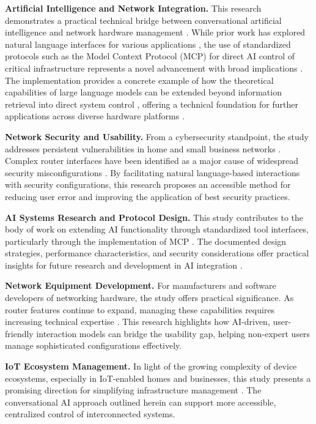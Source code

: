 \textbf{Artificial Intelligence and Network Integration.} This research demonstrates a practical technical bridge between conversational artificial intelligence and network hardware management \cite{ai_mediated_interface}. While prior work has explored natural language interfaces for various applications \cite{nlp_cybersecurity}, the use of standardized protocols such as the Model Context Protocol (MCP) for direct AI control of critical infrastructure represents a novel advancement with broad implications \cite{mcp_developer}. The implementation provides a concrete example of how the theoretical capabilities of large language models \cite{llm_reasoning} can be extended beyond information retrieval into direct system control \cite{mcp_intro}, offering a technical foundation for further applications across diverse hardware platforms \cite{vpn_study}.

\textbf{Network Security and Usability.} From a cybersecurity standpoint, the study addresses persistent vulnerabilities in home and small business networks \cite{consumer_cybersecurity}. Complex router interfaces have been identified as a major cause of widespread security misconfigurations \cite{wifi_security_settings}. By facilitating natural language-based interactions with security configurations, this research proposes an accessible method for reducing user error and improving the application of best security practices.

\textbf{AI Systems Research and Protocol Design.} This study contributes to the body of work on extending AI functionality through standardized tool interfaces, particularly through the implementation of MCP \cite{mcp_intro}. The documented design strategies, performance characteristics, and security considerations offer practical insights for future research and development in AI integration \cite{ai_architecture_review}.

\textbf{Network Equipment Development.} For manufacturers and software developers of networking hardware, the study offers practical significance. As router features continue to expand, managing these capabilities requires increasing technical expertise \cite{router_guide}. This research highlights how AI-driven, user-friendly interaction models can bridge the usability gap, helping non-expert users manage sophisticated configurations effectively.

\textbf{IoT Ecosystem Management.} In light of the growing complexity of device ecosystems, especially in IoT-enabled homes and businesses, this study presents a promising direction for simplifying infrastructure management \cite{iot_device_management}. The conversational AI approach outlined herein can support more accessible, centralized control of interconnected systems.


